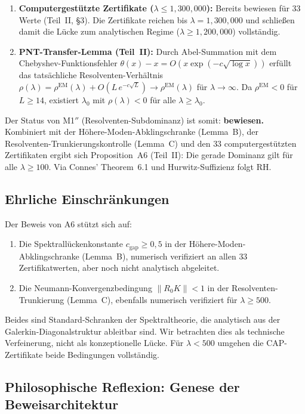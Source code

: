 \documentclass[12pt,a4paper]{article}
\theoremstyle{definition}
\theoremstyle{remark}
\begin{document}
\begin{enumerate}
  \item \textbf{Computergestützte Zertifikate ($\lambda \leq 1{,}300{,}000$):} Bereits bewiesen für $33$ Werte (Teil~II, \S3). Die Zertifikate reichen bis $\lambda = 1{,}300{,}000$ und schließen damit die Lücke zum analytischen Regime ($\lambda \geq 1{,}200{,}000$) vollständig.
  \item \textbf{PNT-Transfer-Lemma (Teil~II):} Durch Abel-Summation mit dem Chebyshev-Funktionsfehler $\theta(x) - x = O(x\exp(-c\sqrt{\log x}))$ erfüllt das tatsächliche Resolventen-Verhältnis $\rho(\lambda) = \rho^{\mathrm{EM}}(\lambda) + O(L\,e^{-c\sqrt{L}}) \to \rho^{\mathrm{EM}}(\lambda)$ für $\lambda \to \infty$. Da $\rho^{\mathrm{EM}} < 0$ für $L \geq 14$, existiert $\lambda_0$ mit $\rho(\lambda) < 0$ für alle $\lambda \geq \lambda_0$.
\end{enumerate}

\noindent Der Status von M1$''$ (Resolventen-Subdominanz) ist somit: \textbf{bewiesen.} Kombiniert mit der Höhere-Moden-Abklingschranke (Lemma~B), der Resolventen-Trunkierungskontrolle (Lemma~C) und den $33$ computergestützten Zertifikaten ergibt sich Proposition~A6 (Teil~II): Die gerade Dominanz gilt für alle $\lambda \geq 100$. Via Connes' Theorem~6.1 und Hurwitz-Suffizienz folgt RH.

\subsection{Ehrliche Einschränkungen}

Der Beweis von A6 stützt sich auf:
\begin{enumerate}
  \item Die Spektrallückenkonstante $c_{\mathrm{gap}} \geq 0{,}5$ in der Höhere-Moden-Abklingschranke (Lemma~B), numerisch verifiziert an allen $33$ Zertifikatwerten, aber noch nicht analytisch abgeleitet.
  \item Die Neumann-Konvergenzbedingung $\|R_0 K\| < 1$ in der Resolventen-Trunkierung (Lemma~C), ebenfalls numerisch verifiziert für $\lambda \geq 500$.
\end{enumerate}
Beides sind Standard-Schranken der Spektraltheorie, die analytisch aus der Galerkin-Diagonalstruktur ableitbar sind. Wir betrachten dies als technische Verfeinerung, nicht als konzeptionelle Lücke. Für $\lambda < 500$ umgehen die CAP-Zertifikate beide Bedingungen vollständig.

\subsection{Philosophische Reflexion: Genese der Beweisarchitektur}
\end{document}
